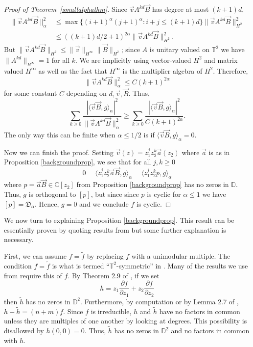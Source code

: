 \documentclass[11 pt,reqno]{amsart}
\theoremstyle{definition}
\theoremstyle{remark}
\numberwithin{equation}{section} \numberwithin{figure}{section}
\begin{document}
\begin{proof}[Proof of Theorem~\ref{smallalphathm}]
Since $\vec{v} A^{kd} \vec{B}$ has degree at most $(k+1)d$, 
\[
\begin{aligned}
\|\vec{v} A^{kd} \vec{B}\|^2_{\alpha} &\leq \max\{ (i+1)^{\alpha}(j+1)^{\alpha}: i+j
\leq (k+1)d \} \|\vec{v} A^{kd}\vec{B} \|^2_{H^2} \\
& \leq ((k+1)d/2+1)^{2{\alpha}} \|\vec{v}
A^{kd} \vec{B} \|^2_{H^2}. 
\end{aligned}
\]
But $\|\vec{v} A^{kd} \vec{B}\|_{H^2} \leq \|\vec{v}\|_{H^{\infty}}
\|\vec{B}\|_{H^2}$; since $A$ is unitary valued on ${{\mathbb T}}^2$ we have
$\|A^{kd}\|_{H^{\infty}} = 1$ for all $k$.  We are implicitly using
vector-valued $H^2$ and matrix valued $H^\infty$ as well as the fact
that $H^\infty$ is the multiplier algebra of $H^2$.  Therefore,
\[
\|\vec{v} A^{kd} \vec{B}\|^2_{\alpha} \leq C (k+1)^{2{\alpha}}
\]
for some constant $C$ depending on $d,\vec{v},\vec{B}$.  
Thus,
\[
\sum_{k\geq 0} \frac{|{\langle {\vec{v}\vec{B}}, {g} \rangle}_{\alpha}|^2}{\|\vec{v} A^{kd}
  \vec{B}\|^2_{\alpha}} \geq \sum_{k\geq 0}
\frac{|{\langle {\vec{v}\vec{B}}, {g} \rangle}_{\alpha}|^2}{ C(k+1)^{2{\alpha}}}.
\]
The only way this can be finite when ${\alpha} \leq 1/2$ is if
${\langle {\vec{v}\vec{B}}, {g} \rangle}_{\alpha} = 0$.

Now we can finish the proof.
Setting $\vec{v}(z) = z_1^j z_2^k \vec{a}(z_2)$ where $\vec{a}$
is as in Proposition \ref{backgroundprop}, we see that for all
$j,k\geq 0$
\[
0 = {\langle {z_1^j z_2^k \vec{a} \vec{B}}, {g} \rangle}_{\alpha} = {\langle {z_1^j z_2^k
  p}, {g} \rangle}_{\alpha}
\]
where $p=\vec{a}\vec{B} \in {{\mathbb C}}[z_2]$ from Proposition \ref{backgroundprop} has no
zeros in ${{\mathbb D}}$.  Thus, $g$ is orthogonal to $[p]$, but since since $p$
is cyclic for ${\alpha} \leq 1$ we have $[p]={\mathfrak{D}_{\alpha}}$.  Hence, $g =0$ and we
conclude $f$ is cyclic.
\end{proof}

We now turn to explaining Proposition \ref{backgroundprop}.  This
result can be essentially proven by quoting results from
\cite{Kne09} but some further explanation is necessary.  

First, we can assume $f = \tilde{f}$ by replacing $f$ with a
unimodular multiple.  The condition $f=\tilde{f}$ is what is termed
``${{\mathbb T}}^2$-symmetric'' in \cite{Kne09}.  Many of the results we use
from \cite{Kne09} require this of $f$.  By Theorem 2.9 of
\cite{Kne09}, if we set
\[
h =z_1 \frac{\partial f}{\partial z_1}+
z_2 \frac{\partial f}{\partial z_2}
\]
then $\tilde{h}$ has no zeros in ${{\mathbb D}}^2$.  Furthermore, by computation
or by Lemma 2.7 of \cite{Kne09}, $h + \tilde{h} = (n+m)f$.  Since $f$
is irreducible, $h$ and $\tilde{h}$ have no factors in common unless
they are multiples of one another by looking at degrees.  This
possibility is disallowed by $h(0,0)=0$.  Thus, $\tilde{h}$ has no
zeros in ${{\mathbb D}}^2$ and no factors in common with $h$.
\end{document}
